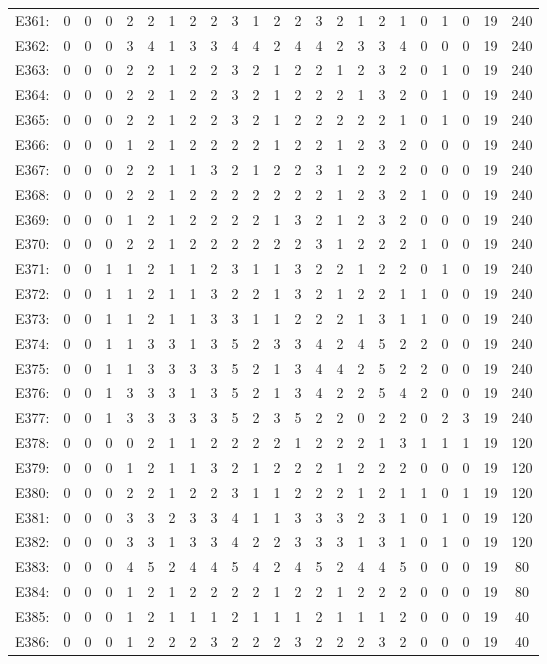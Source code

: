 \documentclass[12pt]{article}
\begin{document}
\begin{center}
\scriptsize
\begin{tabular}{ccccccccccccccccccccc|c|c}
E361:&0&0&0&2&2&1&2&2&3&1&2&2&3&2&1&2&1&0&1&0&19&240\\
E362:&0&0&0&3&4&1&3&3&4&4&2&4&4&2&3&3&4&0&0&0&19&240\\
E363:&0&0&0&2&2&1&2&2&3&2&1&2&2&1&2&3&2&0&1&0&19&240\\
E364:&0&0&0&2&2&1&2&2&3&2&1&2&2&2&1&3&2&0&1&0&19&240\\
E365:&0&0&0&2&2&1&2&2&3&2&1&2&2&2&2&2&1&0&1&0&19&240\\
E366:&0&0&0&1&2&1&2&2&2&2&1&2&2&1&2&3&2&0&0&0&19&240\\
E367:&0&0&0&2&2&1&1&3&2&1&2&2&3&1&2&2&2&0&0&0&19&240\\
E368:&0&0&0&2&2&1&2&2&2&2&2&2&2&1&2&3&2&1&0&0&19&240\\
E369:&0&0&0&1&2&1&2&2&2&2&1&3&2&1&2&3&2&0&0&0&19&240\\
E370:&0&0&0&2&2&1&2&2&2&2&2&2&3&1&2&2&2&1&0&0&19&240\\
E371:&0&0&1&1&2&1&1&2&3&1&1&3&2&2&1&2&2&0&1&0&19&240\\
E372:&0&0&1&1&2&1&1&3&2&2&1&3&2&1&2&2&1&1&0&0&19&240\\
E373:&0&0&1&1&2&1&1&3&3&1&1&2&2&2&1&3&1&1&0&0&19&240\\
E374:&0&0&1&1&3&3&1&3&5&2&3&3&4&2&4&5&2&2&0&0&19&240\\
E375:&0&0&1&1&3&3&3&3&5&2&1&3&4&4&2&5&2&2&0&0&19&240\\
E376:&0&0&1&3&3&3&1&3&5&2&1&3&4&2&2&5&4&2&0&0&19&240\\
E377:&0&0&1&3&3&3&3&3&5&2&3&5&2&2&0&2&2&0&2&3&19&240\\
E378:&0&0&0&0&2&1&1&2&2&2&2&1&2&2&2&1&3&1&1&1&19&120\\
E379:&0&0&0&1&2&1&1&3&2&1&2&2&2&1&2&2&2&0&0&0&19&120\\
E380:&0&0&0&2&2&1&2&2&3&1&1&2&2&2&1&2&1&1&0&1&19&120\\
E381:&0&0&0&3&3&2&3&3&4&1&1&3&3&3&2&3&1&0&1&0&19&120\\
E382:&0&0&0&3&3&1&3&3&4&2&2&3&3&3&1&3&1&0&1&0&19&120\\
E383:&0&0&0&4&5&2&4&4&5&4&2&4&5&2&4&4&5&0&0&0&19&80\\
E384:&0&0&0&1&2&1&2&2&2&2&1&2&2&1&2&2&2&0&0&0&19&80\\
E385:&0&0&0&1&2&1&1&1&2&1&1&1&2&1&1&1&2&0&0&0&19&40\\
E386:&0&0&0&1&2&2&2&3&2&2&2&3&2&2&2&3&2&0&0&0&19&40\\
\end{tabular}
\end{center}
\end{document}
